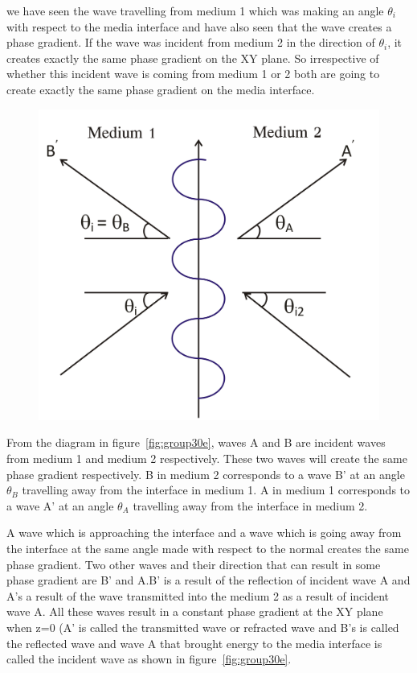 we have seen the wave travelling from medium 1  which was making an angle $\theta_i$ with respect to the media interface and have also seen that the wave creates a phase gradient. If the wave was incident from medium 2 in the direction of $\theta_i$, it creates exactly the same phase gradient on the XY plane. So irrespective of whether this incident wave is coming from medium 1 or 2 both are going to create exactly the same phase gradient on the media interface.
\begin{figure}[h]
\centering
\includegraphics[width=.7\linewidth]{./graphics/group30d}
\caption{}
\label{fig:group30d---copy}
\end{figure}

From the diagram in figure~\ref{fig:group30e}, waves A and B are incident waves from medium 1 and medium 2 respectively. These two waves will create the same phase gradient respectively. B in medium 2 corresponds to a wave B'  at an angle $\theta_B$ travelling away from the interface in medium 1. A in medium 1 corresponds to a wave A' at an angle $\theta_A$ travelling away from the interface in medium 2.

A wave which is approaching the interface and a wave which is going away from the interface at the same angle made with respect to the normal creates the same phase gradient. Two other waves and their direction that can result in some phase gradient are B'
and A.B' is a result of the reflection of incident wave A and A's a result of the wave transmitted into the medium 2 as a result of incident wave A. All these waves result in a constant phase gradient at the XY plane when z=0 (A' is called the transmitted wave or refracted wave and B's is called the reflected wave and wave A that brought energy to the media interface is called the incident wave as shown in figure~\ref{fig:group30e}.

